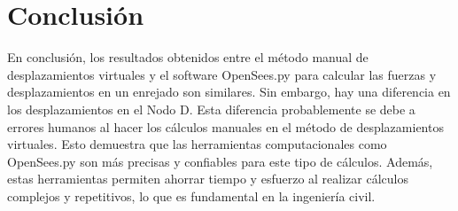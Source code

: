 \documentclass{article}  %
\begin{document}
\newpage

\section{Conclusión}
En conclusión, los resultados obtenidos entre el método manual de desplazamientos virtuales y el software OpenSees.py para calcular las fuerzas y desplazamientos en un enrejado son similares. Sin embargo, hay una diferencia en los desplazamientos en el Nodo D. Esta diferencia probablemente se debe a errores humanos al hacer los cálculos manuales en el método de desplazamientos virtuales. Esto demuestra que las herramientas computacionales como OpenSees.py son más precisas y confiables para este tipo de cálculos. Además, estas herramientas permiten ahorrar tiempo y esfuerzo al realizar cálculos complejos y repetitivos, lo que es fundamental en la ingeniería civil.
\end{document}
